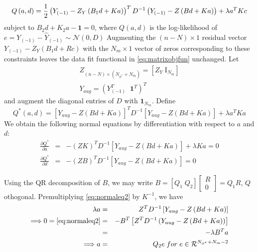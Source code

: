 \begin{equation}
Q\left(a , d \right) =  \frac{1}{2}\left(Y_{\left(-1\right)} - Z_Y\left(B_1d + Ka \right) \right)^T D^{-1} \left(Y_{\left(-1\right)} -  Z\left(Bd + Ka \right)\right) + \lambda a^T K c\\ 
\label{eq:matrixobjfun}
\end{equation} 
\noindent
subject to $B_2 d + K_2 a - \mathbf{1} = 0$, where $Q\left(a , d \right)$ is the log-likelihood of $e  = Y_{\left(-1\right)} - \hat{Y}_{\left(-1\right)} \sim \mathcal{N}\left(0,D\right)$ Augmenting the $\left(n-N\right) \times 1$ residual vector $Y_{\left(-1\right)} - Z_Y\left(B_1d + Rc \right)$ with the $N_m \times 1$ vector of zeros corresponding to these constraints leaves the data fit functional in \eqref{eq:matrixobjfun} unchanged. Let 
\begin{eqnarray*}
Z_{\left(n-N\right) \times \left(N_{\phi^*} + N_m\right)} = \left[Z_Y \; \mathrm{I}_{N_m} \right]\\
Y_{aug} = \left( Y_{\left(-1\right)}^T \;\; \mathbf{1}^T \right)^T
\end{eqnarray*}
\noindent
and augment the diagonal entries of $D$ with $\mathbf{1}_{N_m}$. Define
\begin{equation}
Q^*\left(a,d\right) = \left[Y_{aug} - Z\left(Bd + Ka\right) \right]^T D^{-1} \left[Y_{aug} - Z\left(Bd + Ka\right) \right] + \lambda a^T K a
\label{objectivefunaug}
\end{equation}
\noindent
We obtain the following normal equations by differentiation with respect to $a$ and $d$:
\begin{eqnarray}
\frac{\partial Q^*}{\partial a} &=& - \left(ZK\right)^T D^{-1}\left[Y_{aug} - Z\left(Bd + Ka\right) \right] + \lambda Ka= 0 \label{eq:normaleq1} \\
\frac{\partial Q^*}{\partial d} &=& - \left(ZB\right)^T D^{-1}\left[Y_{aug} - Z\left(Bd + Ka\right) \right] = 0 \label{eq:normaleq2} 
\end{eqnarray}

\noindent
Using the QR decomposition of $B$, we may write $B = \left[ Q_1 \; Q_2\right]\left[ \begin{array}{c} R \\ 0 \end{array}\right] = Q_1 R$,  $Q$ othogonal. Premultiplying \eqref{eq:normaleq2} by $K^{-1}$, we have 
\begin{eqnarray}
 \lambda a &=& Z^T D^{-1}\left[Y_{aug} - Z\left(Bd + Ka\right)\right] \label{eq:solnconst1}  \\
\Longrightarrow 0 =  \eqref{eq:normaleq2} &=&  - B^T\left[ Z^TD^{-1}\left(Y_{aug} - Z\left(Bd + Ka\right) \right) \right] \nonumber\\
 &=& -\lambda B^T a \nonumber \\
 \Longrightarrow a &=& Q_2 e\;for\; e \in \mathcal{R}^{N_{\phi^*} + N_m - 2} \nonumber
\end{eqnarray}

